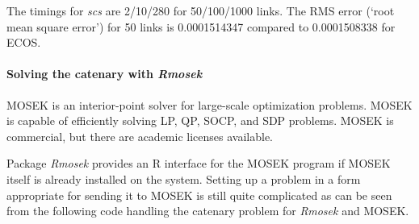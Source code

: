 \documentclass[]{article}
\let\oldparagraph\paragraph
\renewcommand{\paragraph}[1]{\oldparagraph{#1}\mbox{}}
\begin{document}
The timings for \emph{scs} are 2/10/280 for 50/100/1000 links. The RMS
error (`root mean square error') for 50 links is 0.0001514347 compared
to 0.0001508338 for ECOS.

\paragraph{\texorpdfstring{Solving the catenary with
\emph{Rmosek}}{Solving the catenary with Rmosek}}\label{solving-the-catenary-with-rmosek}

MOSEK is an interior-point solver for large-scale optimization problems.
MOSEK is capable of efficiently solving LP, QP, SOCP, and SDP problems.
MOSEK is commercial, but there are academic licenses available.

Package \emph{Rmosek} provides an R interface for the MOSEK program if
MOSEK itself is already installed on the system. Setting up a problem in
a form appropriate for sending it to MOSEK is still quite complicated as
can be seen from the following code handling the catenary problem for
\emph{Rmosek} and MOSEK.
\end{document}
